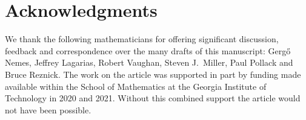 \documentclass[11pt,reqno,a4letter]{article}
\numberwithin{equation}{section}
\numberwithin{figure}{section}
\numberwithin{table}{section}
\theoremstyle{plain}
\numberwithin{theorem}{section}
\theoremstyle{definition}
\begin{document}
\section*{Acknowledgments}

We thank the following mathematicians for offering significant 
discussion, feedback and correspondence over the many drafts of this manuscript: 
Gerg\H{o} Nemes, Jeffrey Lagarias, Robert Vaughan, Steven J.~Miller, 
Paul Pollack and Bruce Reznick. 
The work on the article was supported in part by 
funding made available within the School of Mathematics at the 
Georgia Institute of Technology in 2020 and 2021. 
Without this combined support the article would not have been possible.

\renewcommand{\refname}{References} 

\end{document}
